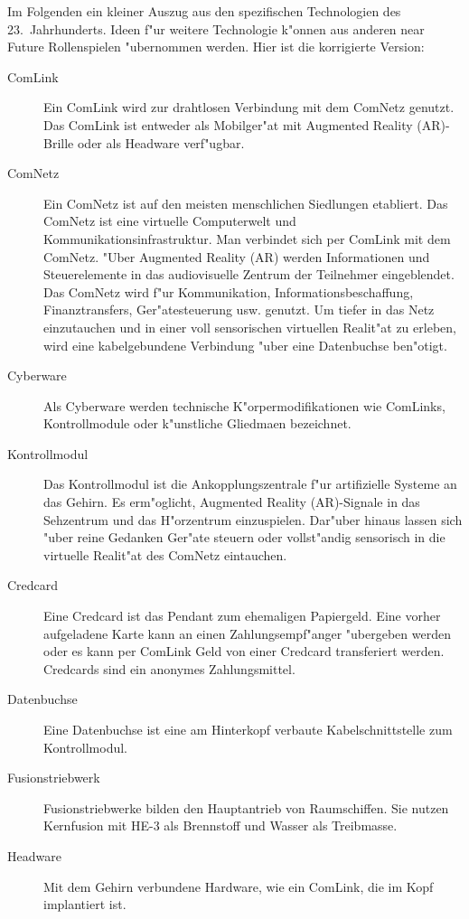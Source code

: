 Im Folgenden ein kleiner Auszug aus den spezifischen Technologien des 23.~Jahrhunderts. Ideen f"ur weitere Technologie k"onnen aus anderen near Future Rollenspielen "ubernommen werden.
Hier ist die korrigierte Version:

\begin{description}
\item [ComLink] Ein ComLink wird zur drahtlosen Verbindung mit dem ComNetz genutzt. Das ComLink ist entweder als Mobilger"at mit     
      Augmented Reality (AR)-Brille oder als Headware verf"ugbar.
\item [ComNetz] Ein ComNetz ist auf den meisten menschlichen Siedlungen etabliert. Das ComNetz ist eine virtuelle Computerwelt und 
      Kommunikationsinfrastruktur. Man verbindet sich per ComLink mit dem ComNetz. "Uber Augmented Reality (AR) werden Informationen und Steuerelemente in das audiovisuelle Zentrum der Teilnehmer eingeblendet. Das ComNetz wird f"ur Kommunikation, Informationsbeschaffung, Finanztransfers, Ger"atesteuerung usw. genutzt. Um tiefer in das Netz einzutauchen und in einer voll sensorischen virtuellen Realit"at zu erleben, wird eine kabelgebundene Verbindung "uber eine Datenbuchse ben"otigt.
\item [Cyberware] Als Cyberware werden technische K"orpermodifikationen wie ComLinks, Kontrollmodule oder k"unstliche Gliedma\3en 
      bezeichnet.
\item [Kontrollmodul] Das Kontrollmodul ist die Ankopplungszentrale f"ur artifizielle Systeme an das Gehirn. Es erm"oglicht, Augmented 
      Reality (AR)-Signale in das Sehzentrum und das H"orzentrum einzuspielen. Dar"uber hinaus lassen sich "uber reine Gedanken Ger"ate steuern oder vollst"andig sensorisch in die virtuelle Realit"at des ComNetz eintauchen.
\item [Credcard] Eine Credcard ist das Pendant zum ehemaligen Papiergeld. Eine vorher aufgeladene Karte kann an einen 
      Zahlungsempf"anger "ubergeben werden oder es kann per ComLink Geld von einer Credcard transferiert werden. Credcards sind ein anonymes Zahlungsmittel.
\item [Datenbuchse] Eine Datenbuchse ist eine am Hinterkopf verbaute Kabelschnittstelle zum Kontrollmodul.
\item [Fusionstriebwerk] Fusionstriebwerke bilden den Hauptantrieb von Raumschiffen. Sie nutzen Kernfusion mit HE-3 als Brennstoff 
      und Wasser als Treibmasse.
\item [Headware] Mit dem Gehirn verbundene Hardware, wie ein ComLink, die im Kopf implantiert ist.

\end{description}
